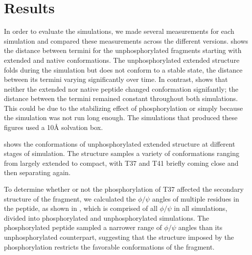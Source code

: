 \section{Results} %
\label{sec:results}


In order to evaluate the simulations, we made several measurements for each simulation and compared these measurements across the different versions.
 shows the distance between termini for the unphosphorylated fragments starting with extended and native conformations.
The unphosphorylated extended structure folds during the simulation but does not conform to a stable state,
the distance between its termini varying significantly over time.
In contrast,  shows that neither the extended nor native peptide changed conformation signifantly;
the distance between the termini remained constant throughout both simulations.
This could be due to the stabilizing effect of phosphorylation or simply because the simulation was not run long enough.
The simulations that produced these figures used a 10{\AA} solvation box.

 shows the conformations of unphosphorylated extended structure at different stages of simulation.
The structure samples a variety of conformations ranging from largely extended to compact, with T37 and T41 briefly coming close and then separating again.

To determine whether or not the phosphorylation of T37 affected the secondary structure of the fragment,
we calculated the $\phi/\psi$ angles of multiple residues in the peptide, as shown in ,
which is comprised of all $\phi/\psi$ in all simulations, divided into phosphorylated and unphosphorylated simulations.
The phosphorylated peptide sampled a narrower range of $\phi/\psi$ angles than its unphosphorylated counterpart,
suggesting that the structure imposed by the phosphorylation restricts the favorable conformations of the fragment.



